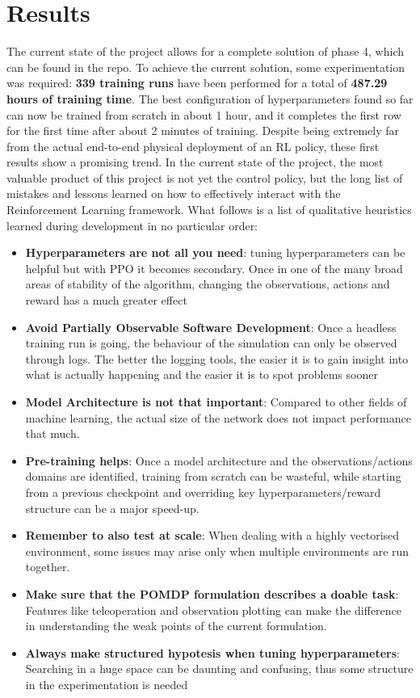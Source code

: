 \documentclass[11pt,a4paper,twocolumn]{article}
\begin{document}
\section{Results}
The current state of the project allows for a complete solution of phase 4, which can be found in the repo. To achieve the current solution, some experimentation was required: \textbf{339 training runs} have been performed for a total of \textbf{487.29 hours of training time}. The best configuration of hyperparameters found so far can now be trained from scratch in about 1 hour, and it completes the first row for the first time after about 2 minutes of training. Despite being extremely far from the actual end-to-end physical deployment of an RL policy, these first results show a promising trend. In the current state of the project, the most valuable product of this project is not yet the control policy, but the long list of mistakes and lessons learned on how to effectively interact with the Reinforcement Learning framework. What follows is a list of qualitative heuristics learned during development in no particular order:
\begin{itemize}
    \item \textbf{Hyperparameters are not all you need}: tuning hyperparameters can be helpful but with PPO it becomes secondary. Once in one of the many broad areas of stability of the algorithm, changing the observations, actions and reward has a much greater effect
    \item \textbf{Avoid Partially Observable Software Development}: Once a headless training run is going, the behaviour of the simulation can only be observed through logs. The better the logging tools, the easier it is to gain insight into what is actually happening and the easier it is to spot problems sooner
    \item \textbf{Model Architecture is not that important}: Compared to other fields of machine learning, the actual size of the network does not impact performance that much.
    \item \textbf{Pre-training helps}: Once a model architecture and the observations/actions domains are identified, training from scratch can be wasteful, while starting from a previous checkpoint and overriding key hyperparameters/reward structure can be a major speed-up.
    \item \textbf{Remember to also test at scale}: When dealing with a highly vectorised environment, some issues may arise only when multiple environments are run together.
    \item \textbf{Make sure that the POMDP formulation describes a doable task}: Features like teleoperation and observation plotting can make the difference in understanding the weak points of the current formulation.
    \item \textbf{Always make structured hypotesis when tuning hyperparameters}: Searching in a huge space can be daunting and confusing, thus some structure in the experimentation is needed 

    
\end{itemize}
\end{document}
